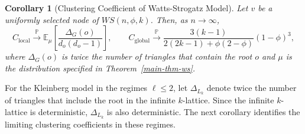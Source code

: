 \documentclass[10pt]{amsart}
\newtheorem{corollary}[theorem]{Corollary}
\begin{document}


\begin{corollary} [Clustering Coefficient of Watts-Strogatz Model] \label{cor1}
Let \(v\) be a uniformly selected node of \(WS(n, \phi, k)\). Then, as \(n \to \infty\), 
\[
C_{\mathrm{local}} \xrightarrow{\mathbb{P}} \mathbb{E}_{\mu}\left[\frac{\Delta_G(o)}{d_o(d_o - 1)}\right],
\qquad C_{\mathrm{global}} \xrightarrow{\mathbb{P}} \frac{3(k-1)}{2(2k-1) + \phi (2 - \phi)} (1-\phi)^3,\]
where \(\Delta_G(o)\) is twice the number of triangles that contain the root \(o\) and \(\mu\) is the distribution specified in Theorem~\ref{main-thm-ws}.
\end{corollary}



For the Kleinberg model in the regimes $\ell \leq 2$, let $\Delta_{L_k}$ denote twice the number of triangles that include the root in the infinite $k$-lattice. Since the infinite $k$-lattice is deterministic, $\Delta_{L_k}$ is also deterministic. The next corollary identifies the limiting clustering coefficients in these regimes.
\end{document}
